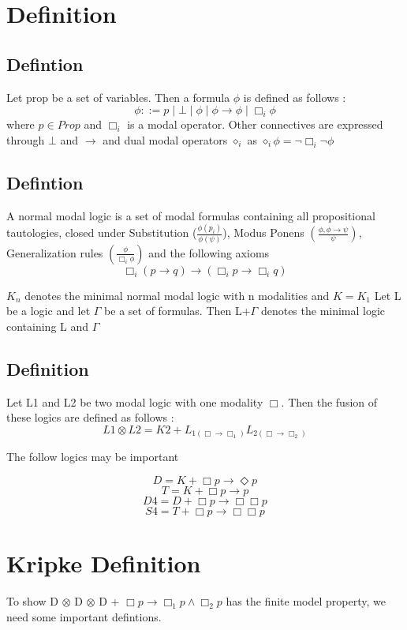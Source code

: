 \documentclass[12pt, a4paper]{scrreprt}
\begin{document}
\chapter{Definition}

\section{Defintion }
Let prop be a set of variables. Then a formula $\phi$ is defined as follows :
$$\phi ::= p \mid \bot \mid \phi \mid \phi \rightarrow \phi \mid \Box_i \phi$$
where $p \in Prop$ and $\Box_i$ is a modal operator. Other connectives are expressed through $\bot$ and $\rightarrow$ and 
dual modal operators $\diamond_i$ as $\diamond_i \phi = \neg \Box_i \neg \phi$

\section{Defintion }
A normal modal logic is a set of modal formulas containing all propositional tautologies,
closed under Substitution ($\frac{\phi(p_i)}{\phi(\psi)}$), Modus Ponens 
$(\frac{\phi, \phi \rightarrow \psi}{\psi})$, Generalization rules $(\frac{\phi}{\Box_i \phi})$
and the following axioms 
$$ \Box_i (p \rightarrow q) \rightarrow (\Box_i p \rightarrow \Box_i q)$$

$K_n$ denotes the minimal normal modal logic with n modalities and $K = K_1$
Let L be a logic and let $\Gamma$ be a set of formulas. Then L+$\Gamma$ denotes 
the minimal logic containing L and $\Gamma$

\section{Definition}
Let L1 and L2 be two modal logic with one modality $\Box$. Then the fusion of these 
logics are defined as follows :
$$ L1 \otimes L2 = K2 + L_{1(\Box \rightarrow \Box_1)} L_{2(\Box \rightarrow \Box_2)} $$

The follow logics may be important 

$$D = K + \Box p \rightarrow \Diamond p$$
$$T = K + \Box p \rightarrow p$$
$$D4 = D + \Box p \rightarrow \Box \Box p$$
$$S4 = T + \Box p \rightarrow \Box \Box p$$

\chapter{Kripke Definition}
To show D $\otimes$ D $\otimes$ D + $\Box p \rightarrow \Box_1 p \land \Box_2 p$ has the finite model property, we need some important defintions.
\end{document}
